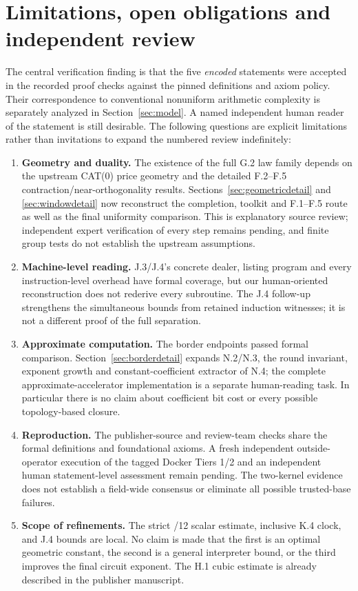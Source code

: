 \documentclass[11pt,letterpaper]{article}
\theoremstyle{definition}\newtheorem{definition}[theorem]{Definition}\newtheorem{example}[theorem]{Example}
\theoremstyle{remark}\newtheorem{remark}[theorem]{Remark}
\begin{document}
\section{Limitations, open obligations and independent review}\label{sec:limits}
The central verification finding is that the five \emph{encoded} statements were accepted in the recorded proof checks against the pinned definitions and axiom policy. Their correspondence to conventional nonuniform arithmetic complexity is separately analyzed in Section~\ref{sec:model}. A named independent human reader of the statement is still desirable. The following questions are explicit limitations rather than invitations to expand the numbered review indefinitely:
\begin{enumerate}[leftmargin=1.7em]
\item \textbf{Geometry and duality.} The existence of the full G.2 law family depends on the upstream CAT(0) price geometry and the detailed F.2--F.5 contraction/near-orthogonality results. Sections~\ref{sec:geometricdetail} and \ref{sec:windowdetail} now reconstruct the completion, toolkit and F.1--F.5 route as well as the final uniformity comparison. This is explanatory source review; independent expert verification of every step remains pending, and finite group tests do not establish the upstream assumptions.
\item \textbf{Machine-level reading.} J.3/J.4's concrete dealer, listing program and every instruction-level overhead have formal coverage, but our human-oriented reconstruction does not rederive every subroutine. The J.4 follow-up strengthens the simultaneous bounds from retained induction witnesses; it is not a different proof of the full separation.
\item \textbf{Approximate computation.} The border endpoints passed formal comparison. Section~\ref{sec:borderdetail} expands N.2/N.3, the round invariant, exponent growth and constant-coefficient extractor of N.4; the complete approximate-accelerator implementation is a separate human-reading task. In particular there is no claim about coefficient bit cost or every possible topology-based closure.
\item \textbf{Reproduction.} The publisher-source and review-team checks share the formal definitions and foundational axioms. A fresh independent outside-operator execution of the tagged Docker Tiers 1/2 and an independent human statement-level assessment remain pending. The two-kernel evidence does not establish a field-wide consensus or eliminate all possible trusted-base failures.
\item \textbf{Scope of refinements.} The strict /12 scalar estimate, inclusive K.4 clock, and J.4 bounds are local. No claim is made that the first is an optimal geometric constant, the second is a general interpreter bound, or the third improves the final circuit exponent. The H.1 cubic estimate is already described in the publisher manuscript.
\end{enumerate}
\end{document}
